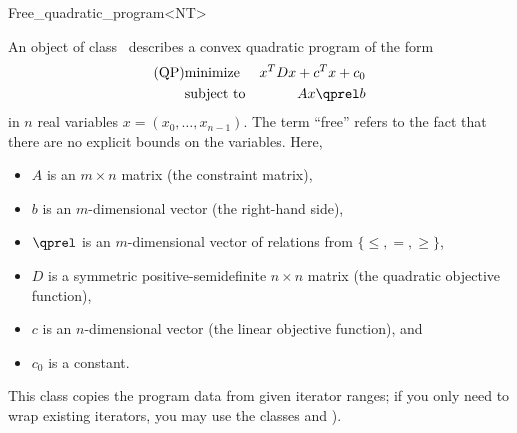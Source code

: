 \begin{ccRefClass}{Free_quadratic_program<NT>}


\ccDefinition
An object of class \ccRefName\ describes a convex quadratic program of the form
\begin{eqnarray*}
\mbox{(QP)}& \mbox{minimize} & x^{T}Dx+c^{T}x+c_0 \\
&\mbox{subject to}   & Ax\qprel b
\end{eqnarray*}
in $n$ real variables $x=(x_0,\ldots,x_{n-1})$. The term ``free'' refers
to the fact that there are no explicit bounds on the variables.
Here, 
\begin{itemize}
\item $A$ is an $m\times n$ matrix (the constraint matrix), 
\item $b$ is an $m$-dimensional vector (the right-hand side),
\item $\qprel$ is an $m$-dimensional vector of relations 
from $\{\leq, =, \geq\}$, 
\item $D$ is a symmetric positive-semidefinite $n\times n$ matrix (the
  quadratic objective function),
\item $c$ is an $n$-dimensional vector (the linear objective
  function), and 
\item $c_0$ is a constant.
\end{itemize}

This class copies the program data from given iterator ranges; 
if you only need to wrap existing iterators, you may use the classes 
 and ).

\ccIsModel
{}

\ccCreation
\ccIndexClassCreation
{}


\ccSeeAlso
{}\\


\end{ccRefClass}
